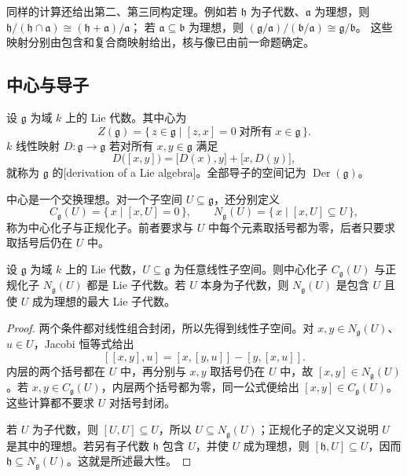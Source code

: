\ProseParagraphBreak

同样的计算还给出第二、第三同构定理。例如若 \(\mathfrak h\) 为子代数、\(\mathfrak a\) 为理想，则 \(\mathfrak h/(\mathfrak h\cap\mathfrak a)\cong(\mathfrak h+\mathfrak a)/\mathfrak a\)； 若 \(\mathfrak a\subseteq\mathfrak b\) 为理想，则 \((\mathfrak g/\mathfrak a)/(\mathfrak b/\mathfrak a)\cong\mathfrak g/\mathfrak b\)。 这些映射分别由包含和复合商映射给出，核与像已由前一命题确定。

\subsection{中心与导子}
\label{b5:subsec:1102:02}

\begin{definition}\label{b5:def:lie-center-derivations}
	设 \(\mathfrak g\) 为域 \(k\) 上的 Lie 代数。其中心为
	\[
		Z(\mathfrak g)=\bigl\{\,z\in\mathfrak g\mid[z,x]=0\;\text{对所有}\;x\in\mathfrak g\,\bigr\}.
	\]
	\(k\) 线性映射 \(D:\mathfrak g\to\mathfrak g\) 若对所有 \(x,y\in\mathfrak g\) 满足
	\[
		D\bigl([x,y]\bigr)=\bigl[D(x),y\bigr]+\bigl[x,D(y)\bigr],
	\]
	就称为 \(\mathfrak g\) 的[derivation of a Lie algebra]。全部导子的空间记为 \(\operatorname{Der}(\mathfrak g)\)。
\end{definition}
中心是一个交换理想。对一个子空间 \(U\subseteq\mathfrak g\)，还分别定义
\[
	C_{\mathfrak g}(U)=\bigl\{\,x\mid[x,U]=0\,\bigr\},\qquad N_{\mathfrak g}(U)=\bigl\{\,x\mid[x,U]\subseteq U\,\bigr\},
\]
称为中心化子与正规化子。前者要求与 \(U\) 中每个元素取括号都为零，后者只要求取括号后仍在 \(U\) 中。
\begin{proposition}\label{b5:prop:lie-centralizer-normalizer}
	设 \(\mathfrak g\) 为域 \(k\) 上的 Lie 代数，\(U\subseteq\mathfrak g\) 为任意线性子空间。则中心化子 \(C_{\mathfrak g}(U)\) 与正规化子 \(N_{\mathfrak g}(U)\) 都是 Lie 子代数。若 \(U\) 本身为子代数，则 \(N_{\mathfrak g}(U)\) 是包含 \(U\) 且使 \(U\) 成为理想的最大 Lie 子代数。
\end{proposition}
\begin{proof}
	两个条件都对线性组合封闭，所以先得到线性子空间。对 \(x,y\in N_{\mathfrak g}(U)\)、\(u\in U\)，Jacobi 恒等式给出
	\[
		[[x,y],u]=[x,[y,u]]-[y,[x,u]].
	\]
	内层的两个括号都在 \(U\) 中，再分别与 \(x,y\) 取括号仍在 \(U\) 中，故 \([x,y]\in N_{\mathfrak g}(U)\)。若 \(x,y\in C_{\mathfrak g}(U)\)，内层两个括号都为零，同一公式便给出 \([x,y]\in C_{\mathfrak g}(U)\)。这些计算都不要求 \(U\) 对括号封闭。

	若 \(U\) 为子代数，则 \([U,U]\subseteq U\)，所以 \(U\subseteq N_{\mathfrak g}(U)\)；正规化子的定义又说明 \(U\) 是其中的理想。若另有子代数 \(\mathfrak h\) 包含 \(U\)，并使 \(U\) 成为理想，则 \([\mathfrak h,U]\subseteq U\)，因而 \(\mathfrak h\subseteq N_{\mathfrak g}(U)\)。这就是所述最大性。
\end{proof}

